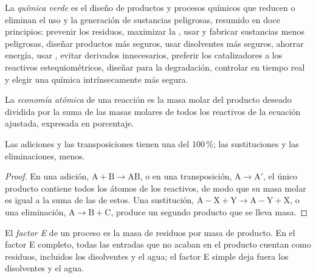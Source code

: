 \begin{definition}\label{def:b3:green-industrial:green-chemistry}
La \emph{química verde} es el diseño de productos y procesos
químicos que reducen o eliminan el uso y la generación de
sustancias peligrosas, resumido en doce principios: prevenir los residuos, maximizar la
, usar y fabricar sustancias menos peligrosas, diseñar productos más seguros,
usar disolventes más seguros, ahorrar energía, usar , evitar derivados
innecesarios, preferir los catalizadores a los reactivos estequiométricos, diseñar para la
degradación, controlar en tiempo real y elegir una química intrínsecamente más segura.
\end{definition}

\begin{definition}\label{def:b3:green-industrial:atom-economy}
La \emph{economía atómica} de una reacción es la masa molar del
producto deseado dividida por la suma de las masas molares de todos los
reactivos de la ecuación ajustada, expresada en porcentaje.
\end{definition}

\begin{proposition}\label{prop:b3:green-industrial:ae-classes}
Las adiciones y las transposiciones tienen una  del 100\,\%; las sustituciones y las
eliminaciones, menos.
\end{proposition}

\begin{proof}
En una adición, $\mathrm{A} + \mathrm{B} \to \mathrm{AB}$, o en una transposición, $\mathrm{A} \to \mathrm{A'}$, el único producto contiene todos los
átomos de los reactivos, de modo que su masa molar es igual a la suma de las de estos. Una
sustitución, $\mathrm{A{-}X} + \mathrm{Y} \to \mathrm{A{-}Y} + \mathrm{X}$, o una eliminación, $\mathrm{A} \to \mathrm{B} + \mathrm{C}$, produce un
segundo producto que se lleva masa.
\end{proof}

\begin{definition}[Factor E]\label{def:b3:green-industrial:e-factor}
El \emph{factor E} de un proceso es la masa de residuos por masa de
producto. En el factor E completo, todas las entradas que no acaban en el producto cuentan como
residuos, incluidos los disolventes y el agua; el factor E simple deja fuera los disolventes y el
agua.
\end{definition}

